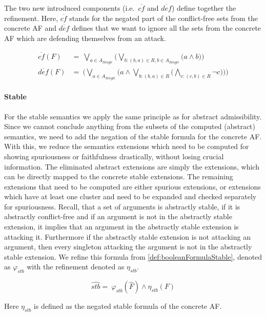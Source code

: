 The two new introduced components (i.e.\ $\overline{cf}$ and $\overline{def}$) define together the refinement. Here, $\overline{cf}$ stands for the negated part of the conflict-free sets from the concrete AF and $\overline{def}$ defines that we want to ignore all the sets from the concrete AF which are defending themselves from an attack.

\begin{align*}
    \overline{cf}(F)&=\ \bigvee_{a \in A_{\mathit{Single}}} \big( \bigvee_{b:(b,a)\in R, b \in A_{\mathit{Single}}} \big( a \land b \big) \big)\\
    \overline{def}(F)&=\ \big( \bigvee_{a \in A_{\mathit{Single}}}\big( a \land \bigvee_{b:(b,a)\in R} \big( \bigwedge_{c:(c, b)\in R} \lnot c\big)\big) \big)
\end{align*}

\paragraph{Stable} For the stable semantics we apply the same principle as for abstract admissibility. Since we cannot conclude anything from the subsets of the computed (abstract) semantics, we need to add the negation of the stable formula for the concrete AF. With this, we reduce the semantics extensions which need to be computed for showing spuriousness or faithfulness drastically, without losing crucial information. The eliminated abstract extensions are simply the extensions, which can be directly mapped to the concrete stable extensions. The remaining extensions that need to be computed are either spurious extensions, or extensions which have at least one cluster and need to be expanded and checked separately for spuriousness. Recall, that a set of
arguments is abstractly stable, if it is abstractly conflict-free and if an argument is not in the abstractly stable extension, it implies that an argument in the abstractly stable extension is attacking it. Furthermore if the abstractly stable extension is not attacking an argument, then every singleton attacking the argument is not in the abstractly stable extension. We refine this formula from \cref{def:booleanFormulaStable}, denoted as $\varphi_{stb}$ with the refinement denoted as $\eta_{stb}$.


$$ \hat{stb}=\  \varphi_{stb}(\hat{F}) \land \eta_{stb}(F) $$

\vspace{0.04cm}
Here $\eta_{stb}$ is defined as the negated stable formula of the concrete AF.
\vspace{0.01cm}


